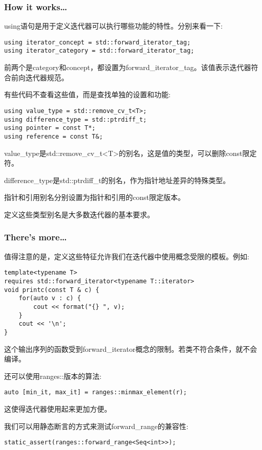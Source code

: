 \subsubsection{How it works…}

using语句是用于定义迭代器可以执行哪些功能的特性。分别来看一下:

\begin{lstlisting}[style=styleCXX]
using iterator_concept = std::forward_iterator_tag;
using iterator_category = std::forward_iterator_tag;
\end{lstlisting}

前两个是category和concept，都设置为forward\_iterator\_tag。该值表示迭代器符合前向迭代器规范。

有些代码不查看这些值，而是查找单独的设置和功能:

\begin{lstlisting}[style=styleCXX]
using value_type = std::remove_cv_t<T>;
using difference_type = std::ptrdiff_t;
using pointer = const T*;
using reference = const T&;
\end{lstlisting}

value\_type是std::remove\_cv\_t<T>的别名，这是值的类型，可以删除const限定符。

difference\_type是std::ptrdiff\_t的别名，作为指针地址差异的特殊类型。

指针和引用别名分别设置为指针和引用的const限定版本。

定义这些类型别名是大多数迭代器的基本要求。

\subsubsection{There's more…}

值得注意的是，定义这些特征允许我们在迭代器中使用概念受限的模板。例如:

\begin{lstlisting}[style=styleCXX]
template<typename T>
requires std::forward_iterator<typename T::iterator>
void printc(const T & c) {
	for(auto v : c) {
		cout << format("{} ", v);
	}
	cout << '\n';
}
\end{lstlisting}

这个输出序列的函数受到forward\_iterator概念的限制。若类不符合条件，就不会编译。

还可以使用ranges::版本的算法:

\begin{lstlisting}[style=styleCXX]
auto [min_it, max_it] = ranges::minmax_element(r);
\end{lstlisting}

这使得迭代器使用起来更加方便。

我们可以用静态断言的方式来测试forward\_range的兼容性:

\begin{lstlisting}[style=styleCXX]
static_assert(ranges::forward_range<Seq<int>>);
\end{lstlisting}









